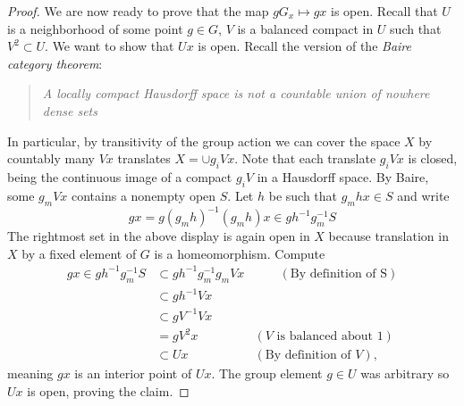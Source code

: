 \documentclass[11pt]{amsart}
\begin{document}
\begin{proof}
We are now ready to prove that the map $gG_x\mapsto gx$ is open. Recall that $U$ is a neighborhood of some point $g\in G$, $V$ is a balanced compact in $U$ such that $V^2\subset U$. We want to show that $Ux$ is open.  Recall the version of the \emph{Baire category theorem}:
\begin{quote}
	\emph{A locally compact Hausdorff space is not a countable union of nowhere dense sets}
\end{quote}
In particular, by transitivity of the group action we can cover the space $X$ by countably many $Vx$ translates $X=\cup g_i V x$. Note that each translate $g_i V x$ is closed, being the continuous image of a compact $g_i V$ in a Hausdorff space.  By Baire, some $g_m V x$ contains a nonempty open $S$. Let $h$ be such that $g_m h x \in S$ and write 
	\begin{equation*}
		gx=g(g_m h)^{-1}(g_m h)x\in g h^{-1}g_{m}^{-1} S
	\end{equation*} 
The rightmost set in the above display is again open in $X$ because translation in $X$ by a fixed element of $G$ is a homeomorphism. Compute
	\begin{align*}
		gx \in g h^{-1}g_{m}^{-1} S  & \subset gh^{-1}g_{m}^{-1} g_m V x  &\qquad \left(\text{By definition of S} \right) \\
						& \subset g h^{-1} V x  \\
						& \subset g V^{-1} V x \\
						& = g V^2 x \qquad &\left( V \text{ is balanced about } 1 \right) \\
						& \subset Ux  \qquad &\left( \text{By definition of } V \right)	,			
	\end{align*}
meaning $gx$ is an interior point of $Ux$. The group element $g \in U$ was arbitrary so $Ux$ is open, proving the claim.
\end{proof}
\end{document}
